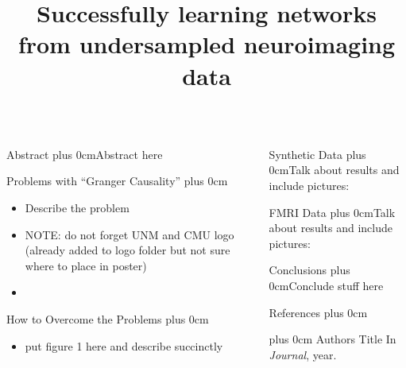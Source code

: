 \documentclass[final,hyperref={pdfpagelabels=false}]{beamer}
\title[Fancy  Posters]{Successfully learning networks from undersampled neuroimaging data}  \author[Plis et
\renewcommand{\raggedright}{\leftskip=0.5cm \rightskip=0.5cm plus 0cm}
\begin{document}
  \begin{frame}{} 
    \begin{columns}[t]
      \begin{column}{.48\linewidth}
        \begin{block}{\Large Abstract}
          \raggedright Abstract here
        \end{block}
        \begin{block}{\Large Problems with ``Granger Causality''}
          \raggedright 
          \begin{itemize}
          \item  Describe the problem
          \item  NOTE: do not forget UNM and CMU logo (already added to logo folder but not sure where to place in poster)
          \item 
          \end{itemize}
        \end{block}
        \begin{block}{\Large How to Overcome the Problems}
          \raggedright  
          \begin{itemize}
          \item put figure 1 here and describe succinctly 
          \end{itemize}
        \end{block}
  

      \end{column}
      \begin{column}{.48\linewidth}
        \begin{block}{\Large Synthetic Data}
          \raggedright Talk about results and include pictures: \vskip5cm
          \vskip5.5cm
        \end{block}
        
        \begin{block}{\Large FMRI Data}
          \raggedright Talk about results and include pictures: \vskip5cm
          \vskip5.5cm
        \end{block}

        \begin{block}{\Large Conclusions}
          \raggedright Conclude stuff here
        \end{block}
        \begin{block}{References}
          \raggedright
          \footnotesize
          \begin{thebibliography}{2}
            \raggedright
            Authors
            \newblock Title
            \newblock In \emph{Journal}, year.
          \end{thebibliography}
        \end{block}
      \end{column}
    \end{columns}
  \end{frame}
\end{document}
